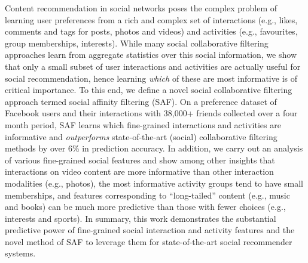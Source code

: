 %

Content recommendation in social networks poses the complex problem of
learning user preferences from a rich and complex set of interactions
(e.g., likes, comments and tags for posts, photos and videos) and
activities (e.g., favourites, group memberships, interests).  While
many social collaborative filtering approaches learn from aggregate
statistics over this social information, we show that only a small
subset of user interactions and activities are actually useful for
social recommendation, hence learning \emph{which} of these are most
informative is of critical importance.  To this end, we define a novel
social collaborative filtering approach termed social affinity
filtering (SAF).  On a preference dataset of Facebook users and their
interactions with 38,000+ friends collected over a four month period,
SAF learns which fine-grained interactions and activities are
informative and \emph{outperforms} state-of-the-art (social)
collaborative filtering methods by over 6\% in prediction accuracy.
In addition, we carry out an analysis of various fine-grained social
features and show among other insights that interactions on video
content are more informative than other interaction modalities (e.g.,
photos), the most informative activity groups tend to have small
memberships, and features corresponding to ``long-tailed'' content
(e.g., music and books) can be much more predictive than those with
fewer choices (e.g., interests and sports).
In summary, this work demonstrates the substantial predictive power of
fine-grained social interaction and activity features and the novel
method of SAF to leverage them for state-of-the-art social recommender
systems.

